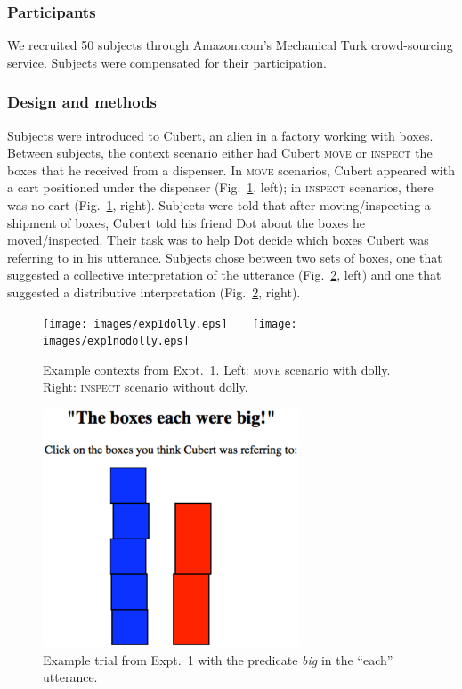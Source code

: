 \documentclass[linguex]{sp}
\begin{document}
\subsubsection{Participants}

We recruited 50 subjects through Amazon.com's Mechanical Turk crowd-sourcing service. Subjects were compensated for their participation.


\subsubsection{Design and methods}

Subjects were introduced to Cubert, an alien in a factory working with boxes. Between subjects, the context scenario either had Cubert \textsc{move} or \textsc{inspect} the boxes that he received from a dispenser. In \textsc{move} scenarios, Cubert appeared with a cart positioned under the dispenser (Fig.~\ref{expt1context}, left); in \textsc{inspect} scenarios, there was no cart (Fig.~\ref{expt1context}, right). Subjects were told that after moving/inspecting a shipment of boxes, Cubert told his friend Dot about the boxes he moved/inspected. Their task was to help Dot decide which boxes Cubert was referring to in his utterance. Subjects chose between two sets of boxes, one that suggested a collective interpretation of the utterance (Fig.\ \ref{expt1trial}, left) and one that suggested a distributive interpretation (Fig.\ \ref{expt1trial}, right).

\begin{figure}[h]
	\centering
	\texttt{[image: images/exp1dolly.eps]}\ \ \ \ 
	\texttt{[image: images/exp1nodolly.eps]}
	\caption{Example contexts from Expt.~1. Left: \textsc{move} scenario with dolly. Right: \textsc{inspect} scenario without dolly.}\label{expt1context}
\end{figure}

\begin{figure}[h]
	\centering
	\includegraphics[width=3in]{images/trial2.eps}
	\caption{Example trial from Expt.~1 with the predicate \emph{big} in the ``each'' utterance.}\label{expt1trial}
\end{figure}
\end{document}
